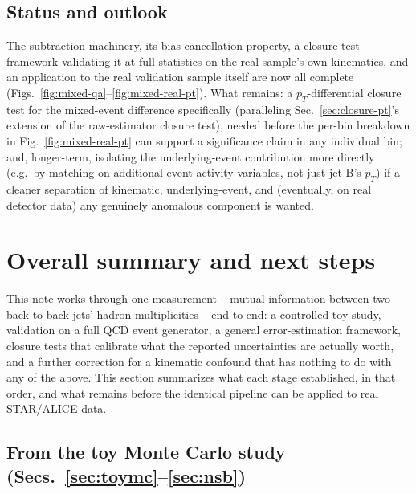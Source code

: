 \documentclass[11pt]{article}
\begin{document}
\subsection{Status and outlook}

The subtraction machinery, its bias-cancellation property, a
closure-test framework validating it at full statistics on the real
sample's own kinematics, and an application to the real validation
sample itself are now all complete
(Figs.~\ref{fig:mixed-qa}--\ref{fig:mixed-real-pt}). What remains: a
$p_T$-differential closure test for the mixed-event difference
specifically (paralleling Sec.~\ref{sec:closure-pt}'s extension of the
raw-estimator closure test), needed before the per-bin breakdown in
Fig.~\ref{fig:mixed-real-pt} can support a significance claim in any
individual bin; and, longer-term, isolating the underlying-event
contribution more directly (e.g.\ by matching on additional event
activity variables, not just jet-B's $p_T$) if a cleaner separation of
kinematic, underlying-event, and (eventually, on real detector data)
any genuinely anomalous component is wanted.

\section{Overall summary and next steps}
\label{sec:conclusions}

This note works through one measurement -- mutual information between
two back-to-back jets' hadron multiplicities -- end to end: a controlled
toy study, validation on a full QCD event generator, a general
error-estimation framework, closure tests that calibrate what the
reported uncertainties are actually worth, and a further correction for
a kinematic confound that has nothing to do with any of the above. This
section summarizes what each stage established, in that order, and what
remains before the identical pipeline can be applied to real STAR/ALICE
data.

\subsection{From the toy Monte Carlo study (Secs.~\ref{sec:toymc}--\ref{sec:nsb})}
\end{document}
